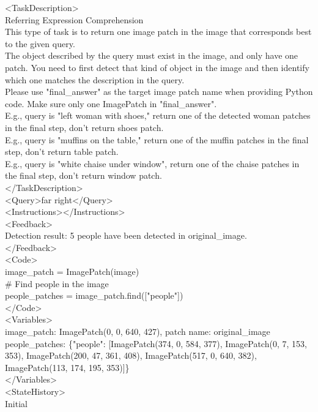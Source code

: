 \documentclass{article} %
\newcommand{\methodname}{MATA}
\newcommand{\datasetname}{\methodname-SFT-90K}
\begin{document}
\begin{prompt}[title={Example \thetcbcounter: \datasetname{} Example Input}]
<TaskDescription>\\
Referring Expression Comprehension\\
This type of task is to return one image patch in the image that corresponds best to the given query. \\
The object described by the query must exist in the image, and only have one patch. You need to first detect that kind of object in the image and then identify which one matches the description in the query. \\
Please use "final\_answer" as the target image patch name when providing Python code. Make sure only one ImagePatch in "final\_answer".\\
E.g., query is "left woman with shoes," return one of the detected woman patches in the final step, don't return shoes patch.\\
E.g., query is "muffins on the table," return one of the muffin patches in the final step, don't return table patch.\\
E.g., query is "white chaise under window", return one of the chaise patches in the final step, don't return window patch.\\
</TaskDescription>\\
<Query>far right</Query>\\
<Instructions></Instructions>\\
<Feedback>\\
Detection result: 5 people have been detected in original\_image.\\
</Feedback>\\
<Code>\\
image\_patch = ImagePatch(image)\\
\# Find people in the image\\
people\_patches = image\_patch.find(["people"])\\
</Code>\\
<Variables>\\
image\_patch: ImagePatch(0, 0, 640, 427), patch name: original\_image\\
people\_patches: \{"people": [ImagePatch(374, 0, 584, 377), ImagePatch(0, 7, 153, 353), ImagePatch(200, 47, 361, 408), ImagePatch(517, 0, 640, 382), ImagePatch(113, 174, 195, 353)]\}\\
</Variables>\\
<StateHistory>\\
Initial\\

\end{prompt}
\end{document}
